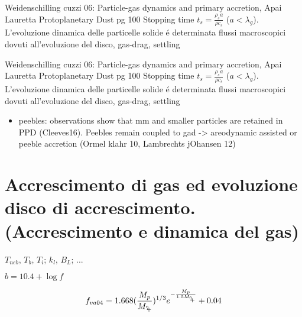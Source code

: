 \begin{workout}
	Weidenschilling cuzzi 06: Particle-gas dynamics and primary accretion, Apai Lauretta Protoplanetary Dust pg 100
	Stopping time $t_s=\frac{\rho_sa}{\rho c_s}$ ($a<\lambda_g$). L'evoluzione dinamica delle particelle solide \'e determinata flussi macroscopici dovuti all'evoluzione del disco, gas-drag, settling
\end{workout}

\begin{workout}
	Weidenschilling cuzzi 06: Particle-gas dynamics and primary accretion, Apai Lauretta Protoplanetary Dust pg 100
	Stopping time $t_s=\frac{\rho_sa}{\rho c_s}$ ($a<\lambda_g$). L'evoluzione dinamica delle particelle solide \'e determinata flussi macroscopici dovuti all'evoluzione del disco, gas-drag, settling
\end{workout}

\begin{workout}
	\begin{itemize}
		\item peebles: observations show that mm and smaller particles are retained in PPD (Cleeves16). Peebles remain coupled to gad -> areodynamic assisted or peeble accretion (Ormel klahr 10, Lambrechts jOhansen 12)
	\end{itemize}
\end{workout}

{\let\clearpage\relax\let\cleardoublepage\relax
\chapter{Accrescimento di gas ed evoluzione disco di accrescimento.  (Accrescimento e dinamica del gas)}\label{chap:gasaccretion}
}%
\begin{workout}
$T_{neb}$, $T_b$, $T_i$; $k_l$, $B_L$; ...
\end{workout}
\begin{workout}
	$b=10.4+\log{f}$
\end{workout}

\begin{workout}
	\begin{equation}
	f_{va04}=1.668(\frac{M_p}{\mjupiter{}})\expy{1/3}\exp{-\frac{M_p}{1.5\mjupiter{}}}+0.04
	\end{equation}
\end{workout}

